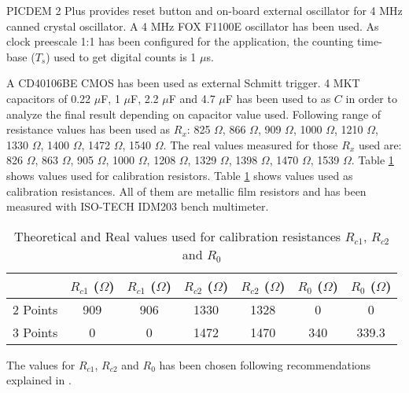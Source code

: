 PICDEM 2 Plus provides reset button and on-board external oscillator for 4 MHz canned crystal oscillator. A 4 MHz FOX F1100E oscillator has been used. As clock preescale 1:1 has been configured for the application, the counting time-base ($T_{s}$) used to get digital counts is 1 $\mu$s.
\medskip

A CD40106BE CMOS has been used as external Schmitt trigger. 4 MKT capacitors of 0.22 $\mu$F, 1 $\mu$F, 2.2 $\mu$F and 4.7 $\mu$F has been used to as $C$ in order to analyze the final result depending on capacitor value used. Following range of resistance values has been used as $R_{x}$: 825 $\Omega$, 866 $\Omega$, 909 $\Omega$, 1000 $\Omega$, 1210 $\Omega$, 1330 $\Omega$, 1400 $\Omega$, 1472 $\Omega$, 1540 $\Omega$. The real values measured for those $R_{x}$ used are: 826 $\Omega$, 863 $\Omega$, 905 $\Omega$, 1000 $\Omega$, 1208 $\Omega$, 1329 $\Omega$, 1398 $\Omega$, 1470 $\Omega$, 1539 $\Omega$. Table \ref{tab:CalibrationResUsedInR} shows values used for calibration resistors. Table \ref{tab:CalibrationResUsedInR} shows values used as calibration resistances. All of them are metallic film resistors and has been measured with ISO-TECH IDM203 bench multimeter.

\begin{savenotes}
	\begin{table}[!ht]
	\centering
		\begin{tabular}{|c|c|c|c|c|c|c|}
		\hline 
		& $R_{c1}$ ($\Omega$) & $R_{c1}$ ($\Omega$) & $R_{c2}$ ($\Omega$) & $R_{c2}$ ($\Omega$) & $R_{0}$ ($\Omega$) & $R_{0}$ ($\Omega$) \\
		\hline
		2 Points & 909 & 906 & 1330 & 1328 & 0 & 0 \\
		\hline
		3 Points & 0 & 0 & 1472 & 1470 & 340 & 339.3 \\
		\hline
		\end{tabular}
	\caption{Theoretical and Real values used for calibration resistances $R_{c1}$, $R_{c2}$ and $R_{0}$}
	\label{tab:CalibrationResUsedInR}
	\end{table}
\end{savenotes}

The values for $R_{c1}$, $R_{c2}$ and $R_{0}$ has been chosen following recommendations explained in \cite{AccuracyAndResolution}.